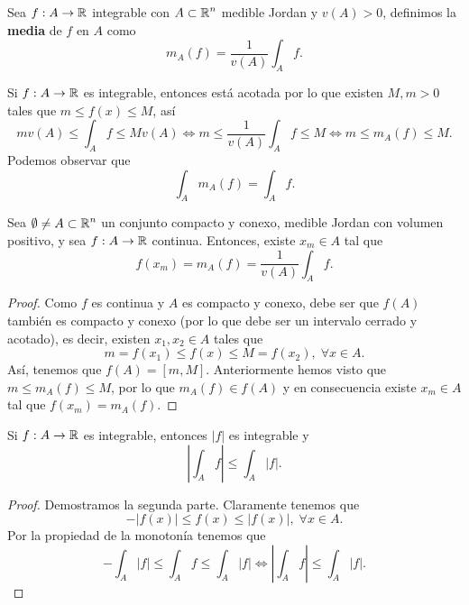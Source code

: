 \begin{definition}[Media]
Sea $\displaystyle f : A \to \mathbb{R} $ integrable con $\displaystyle A \subset \mathbb{R}^{n} $ medible Jordan y $\displaystyle v\left(A\right) > 0 $, definimos la \textbf{media} de $\displaystyle f $ en $\displaystyle A $ como 
\[m_{A}\left(f\right) = \frac{1}{v\left(A\right)}\int _{A}f .\]
\end{definition}
\begin{observation}
Si $\displaystyle f : A \to \mathbb{R} $ es integrable, entonces está acotada por lo que existen $\displaystyle M,m > 0 $ tales que $\displaystyle m \leq f\left(x\right) \leq M $, así
\[mv\left(A\right) \leq \int _{A}f \leq Mv\left(A\right) \iff m\leq \frac{1}{v\left(A\right)}\int _{A}f \leq M \iff m \leq m_{A}\left(f\right) \leq M .\]
Podemos observar que 
\[\int _{A}m_{A}\left(f\right) = \int _{A}f .\]
\end{observation}
\begin{theorem}
Sea $\displaystyle \emptyset \neq A \subset \mathbb{R}^{n} $ un conjunto compacto y conexo, medible Jordan con volumen positivo, y sea $\displaystyle f : A \to \mathbb{R} $ continua. Entonces, existe $\displaystyle x_{m} \in A $ tal que 
\[f\left(x_{m}\right) = m_{A}\left(f\right) = \frac{1}{v\left(A\right)}\int _{A}f .\]
\end{theorem}
\begin{proof}
Como $\displaystyle f  $ es continua y $\displaystyle A $ es compacto y conexo, debe ser que $\displaystyle f\left(A\right) $ también es compacto y conexo (por lo que debe ser un intervalo cerrado y acotado), es decir, existen $\displaystyle x_{1}, x_{2} \in A $ tales que 
\[m = f\left(x_{1}\right) \leq f\left(x\right) \leq M = f\left(x_{2}\right), \; \forall x \in A .\]
Así, tenemos que $\displaystyle f\left(A\right) = \left[m,M\right]  $. Anteriormente hemos visto que $\displaystyle m \leq m_{A}\left(f\right) \leq M $, por lo que $\displaystyle m_{A}\left(f\right) \in f\left(A\right) $ y en consecuencia existe $\displaystyle x_{m} \in A $ tal que $\displaystyle f\left(x_{m}\right) = m_{A}\left(f\right) $. 
\end{proof}
\begin{prop}
Si $\displaystyle f : A \to \mathbb{R} $ es integrable, entonces $\displaystyle \left|f\right| $ es integrable y
\[ \left|\int _{A}f \right| \leq \int _{A} \left|f\right| .\]
\end{prop}
\begin{proof}
Demostramos la segunda parte. Claramente tenemos que 
\[- \left|f\left(x\right)\right| \leq f\left(x\right) \leq \left|f\left(x\right)\right|, \; \forall x \in A .\]
Por la propiedad de la monotonía tenemos que 
\[-\int _{A} \left|f\right| \leq \int _{A}f \leq \int _{A} \left|f\right| \iff \left|\int _{A}f \right|\leq \int _{A} \left|f\right| .\]
\end{proof}

